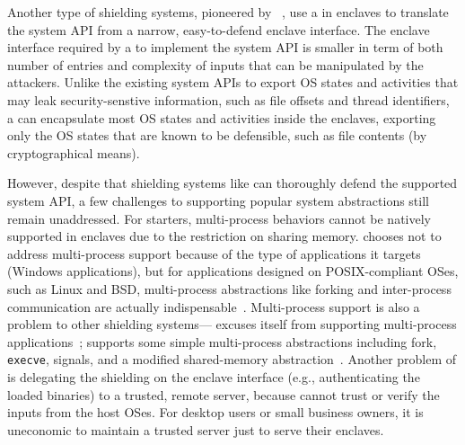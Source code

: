 Another type of \sgx{} shielding systems, pioneered by \haven{}~\cite{baumann14haven},
use a {\bf \libos{}} in enclaves to translate the system API from a narrow, easy-to-defend enclave interface.
The enclave interface required by a \libos{} to implement the system API
is smaller in term of both number of entries and complexity of inputs that can be manipulated by the attackers.
Unlike the existing system APIs to export OS states and activities that may leak security-senstive information,
such as file offsets and thread identifiers,
a \libos{} can encapsulate most OS states and activities inside the enclaves,
exporting only the OS states that are known to be defensible, such as file contents (by cryptographical means).



However, despite that shielding systems like \haven{} can thoroughly defend the supported system API, a few challenges to supporting popular system abstractions still remain unaddressed.
For starters, 
multi-process behaviors cannot be natively supported in enclaves due to the restriction on sharing memory.
\haven{} chooses not to address multi-process support because of the type of applications it targets (Windows applications),
but for applications designed on POSIX-compliant OSes, such as Linux and BSD, multi-process abstractions like forking and inter-process communication are actually indispensable~\cite{tsai16apistudy}.
Multi-process support is also a problem to other shielding systems---\scone{} excuses itself from supporting multi-process applications~\cite{osdi16scone}; \panoply{} supports some simple multi-process abstractions including fork, {\tt execve}, signals, and a modified shared-memory abstraction~\cite{shinde17panoply}.
Another problem of \haven{} is delegating the shielding on the enclave interface (e.g., authenticating the loaded binaries) to a trusted, remote server,
because \haven{} cannot trust or verify the inputs from the host OSes.
For desktop users or small business owners, it is uneconomic to maintain a trusted server
just to serve their enclaves.







